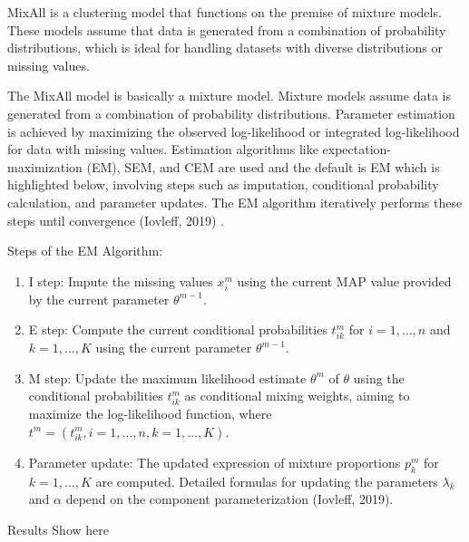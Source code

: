 \documentclass[11pt, a4paper]{article}
\begin{document}
MixAll is a clustering model that functions on the premise of mixture models. These models assume that data is generated from a combination of probability distributions, which is ideal for handling datasets with diverse distributions or missing values.
\par
The MixAll model is basically a mixture model. Mixture models assume data is generated from a combination of probability distributions. Parameter estimation is achieved by maximizing the observed log-likelihood or integrated log-likelihood for data with missing values. Estimation algorithms like expectation-maximization (EM), SEM, and CEM are used and the default is EM which is highlighted below, involving steps such as imputation, conditional probability calculation, and parameter updates. The EM algorithm iteratively performs these steps until convergence (Iovleff, 2019) .
\par
Steps of the EM Algorithm:
\begin{enumerate}
\item I step: Impute the missing values $x^{m}_{i}$ using the current MAP value provided by the current parameter $\theta^{m-1}$.
\item E step: Compute the current conditional probabilities $t^{m}_{ik}$ for $i = 1, \ldots, n$ and $k = 1, \ldots, K$ using the current parameter $\theta^{m-1}$.
\item M step: Update the maximum likelihood estimate $\theta^{m}$ of $\theta$ using the conditional probabilities $t^{m}_{ik}$ as conditional mixing weights, aiming to maximize the log-likelihood function, where $t^{m} = (t^{m}_{ik}, i = 1, \ldots, n, k = 1, \ldots, K)$.
\item Parameter update: The updated expression of mixture proportions $p^{m}_{k}$ for $k = 1, \ldots, K$ are computed. Detailed formulas for updating the parameters $\lambda_{k}$ and $\alpha$ depend on the component parameterization (Iovleff, 2019).
\end{enumerate}

Results
Show here
\end{document}
